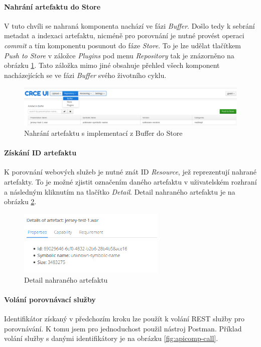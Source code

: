 \documentclass[czech,DP]{thesiskiv}
\begin{document}
\paragraph{Nahrání artefaktu do Store}
V tuto chvíli se nahraná komponenta nachází ve fázi \textit{Buffer}. Došlo tedy k sebrání metadat a indexaci artefaktu, nicméně pro porovnání je nutné provést operaci \textit{commit} a tím komponentu posunout do fáze \textit{Store}. To je lze udělat tlačítkem \textit{Push to Store} v záložce \textit{Plugins} pod menu \textit{Repository} tak je znázorněno na obrázku \ref{fig:crce-art-push-to-store}. Tato záložka mimo jiné obsahuje přehled všech komponent nacházejících se ve fázi \textit{Buffer} svého životního cyklu.

\begin{figure}[h]
	\centering
	\includegraphics[width=\linewidth]{crce-art-push-to-store.png}
	\caption{Nahrání artefaktu s implementací z Buffer do Store}
	\label{fig:crce-art-push-to-store}
\end{figure}

\paragraph{Získání ID artefaktu}
K porovnání webových služeb je nutné znát ID \textit{Resource}, jež reprezentují nahrané artefakty. To je možné zjistit označením daného artefaktu v uživatelském rozhraní a následným kliknutím na tlačítko \textit{Detail}. Detail nahraného artefaktu je na obrázku \ref{fig:crce-art-detail}.

\begin{figure}[h]
	\centering
	\includegraphics[width=7cm]{crce-art-detail.png}
	\caption{Detail nahraného artefaktu}
	\label{fig:crce-art-detail}
\end{figure}

\paragraph{Volání porovnávací služby}
Identifikátor získaný v předchozím kroku lze použít k volání REST služby pro porovnávání. K tomu jsem pro jednoduchost použil nástroj Postman. Příklad volání služby s danými identifikátory je na obrázku \ref{fig:apicomp-call}.
\end{document}
